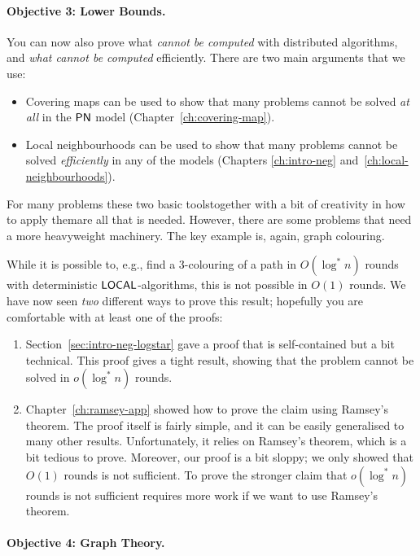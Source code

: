 \paragraph{Objective 3: Lower Bounds.}

You can now also prove what \emph{cannot be computed} with distributed algorithms, and \emph{what cannot be computed} efficiently. There are two main arguments that we use:
\begin{itemize}
    \item Covering maps can be used to show that many problems cannot be solved \emph{at all} in the $\textup{\sffamily PN}$ model (Chapter~\ref{ch:covering-map}).
    \item Local neighbourhoods can be used to show that many problems cannot be solved \emph{efficiently} in any of the models (Chapters \ref{ch:intro-neg} and~\ref{ch:local-neighbourhoods}).
\end{itemize}
For many problems these two basic tools\mydash together with a bit of creativity in how to apply them\mydash are all that is needed. However, there are some problems that need a more heavyweight machinery. The key example is, again, graph colouring.

While it is possible to, e.g., find a $3$-colouring of a path in $O(\log^* n)$ rounds with deterministic $\textup{\sffamily LOCAL}$-algorithms, this is not possible in $O(1)$ rounds. We have now seen \emph{two} different ways to prove this result; hopefully you are comfortable with at least one of the proofs:
\begin{enumerate}
    \item Section~\ref{sec:intro-neg-logstar} gave a proof that is self-contained but a bit technical. This proof gives a tight result, showing that the problem cannot be solved in $o(\log^* n)$ rounds.
    \item Chapter~\ref{ch:ramsey-app} showed how to prove the claim using Ramsey's theorem. The proof itself is fairly simple, and it can be easily generalised to many other results. Unfortunately, it relies on Ramsey's theorem, which is a bit tedious to prove. Moreover, our proof is a bit sloppy; we only showed that $O(1)$ rounds is not sufficient. To prove the stronger claim that $o(\log^* n)$ rounds is not sufficient requires more work if we want to use Ramsey's theorem.
\end{enumerate}


\paragraph{Objective 4: Graph Theory.}

